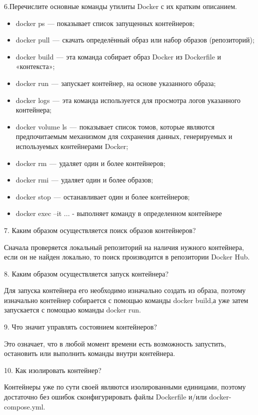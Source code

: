 6.Перечислите основные команды утилиты Docker с их кратким описанием.

\begin{itemize}
    \item docker ps  — показывает список запущенных контейнеров;
    \item docker pull  —  скачать определённый образ или набор образов (репозиторий);
    \item docker build  —  эта команда собирает образ Docker из Dockerfile и «контекста»;
    \item docker run  —  запускает контейнер, на основе указанного образа;
    \item docker logs  —  эта команда используется для просмотра логов указанного контейнера;
    \item docker volume ls  —  показывает список томов, которые являются предпочитаемым механизмом для сохранения данных, генерируемых и используемых контейнерами Docker;
    \item docker rm  —  удаляет один и более контейнеров;
    \item docker rmi  —  удаляет один и более образов;
    \item docker stop  —  останавливает один и более контейнеров;
    \item docker exec –it ... - выполняет команду в определенном контейнере
\end{itemize}

7. Каким образом осуществляется поиск образов контейнеров?

Сначала проверяется локальный репозиторий на наличия нужного контейнера, если он не найден локально, то поиск производится в репозитории Docker Hub.

8. Каким образом осуществляется запуск контейнера?

Для запуска контейнера его необходимо изначально создать из образа, поэтому изначально контейнер собирается с помощью команды docker build,а уже затем запускается с помощью команды docker run.

9. Что значит управлять состоянием контейнеров?

Это означает, что в любой момент времени есть возможность запустить, остановить или выполнить команды внутри контейнера.

10. Как изолировать контейнер?

Контейнеры уже по сути своей являются изолированными единицами, поэтому достаточно без ошибок сконфигурировать файлы Dockerfile и/или docker-compose.yml.

